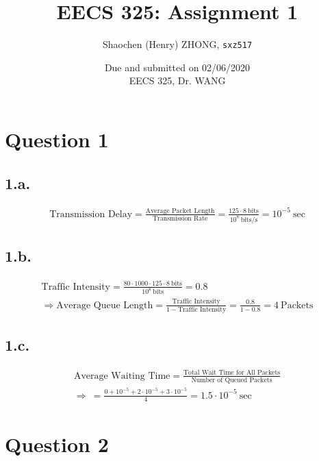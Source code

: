 \documentclass[12pt]{article}
\newcommand{\inlinecode}{\texttt}
\begin{document}
\title{\textbf{EECS 325: Assignment 1}}

\author{Shaochen (Henry) ZHONG, \inlinecode{sxz517} }
\date{Due and submitted on 02/06/2020 \\ EECS 325, Dr. WANG}
\maketitle

\section{Question 1}

\subsection{1.a.}

\begin{gather}
    \text{Transmission Delay} = \frac{\text{Average Packet Length}}{\text{Transmission Rate}} = \frac{125\cdot 8 \  \text{bits}}{10^8 \ \text{bits/s}} = 10^{-5} \ \text{sec}
\end{gather}

\subsection{1.b.}

\begin{gather}
    \text{Traffic Intensity} =  \frac{80 \cdot 1000 \cdot 125 \cdot 8 \  \text{bits}}{10^8 \ \text{bits}} = 0.8 \\
    \Rightarrow \text{Average Queue Length} = \frac{\text{Traffic Intensity}}{\text{$1 - $Traffic Intensity}} = \frac{0.8}{1-0.8} = 4 \ \text{Packets}
\end{gather}

\subsection{1.c.}

\begin{gather}
    \text{Average Waiting Time} = \frac{\text{Total Wait Time for All Packets}}{\text{Number of Queued Packets}} \nonumber \\
    \Longrightarrow \ = \frac{0 + 10^{-5} + 2 \cdot 10^{-5}  + 3 \cdot 10^{-5}}{4} = 1.5 \cdot 10^{-5} \ \text{sec}
\end{gather}


\section{Question 2}
\end{document}

